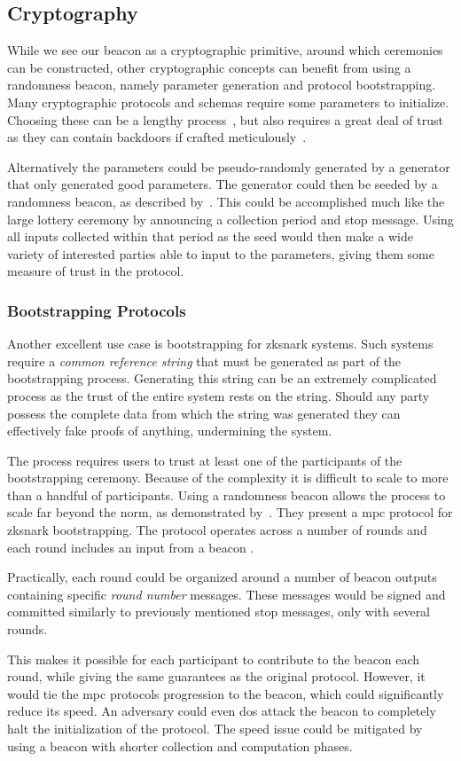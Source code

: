 \subsection{Cryptography}
While we see our beacon as a cryptographic primitive, around which ceremonies can be constructed, other cryptographic concepts can benefit from using a randomness beacon, namely parameter generation and protocol bootstrapping.
Many cryptographic protocols and schemas require some parameters to initialize.
Choosing these can be a lengthy process~\cite{mpcsnarks}, but also requires a great deal of trust as they can contain backdoors if crafted meticulously~\cite{nist2014backdoor}.

Alternatively the parameters could be pseudo-randomly generated by a generator that only generated good parameters.
The generator could then be seeded by a randomness beacon, as described by~\citet{baigneres2015trap}.
This could be accomplished much like the large lottery ceremony by announcing a collection period and stop message.
Using all inputs collected within that period as the seed would then make a wide variety of interested parties able to input to the parameters, giving them some measure of trust in the protocol.

\subsubsection{Bootstrapping Protocols}%
\label{ssub:bootstrapping_protocols}
Another excellent use case is bootstrapping for \gls{zksnark} systems.
Such systems require a \emph{common reference string} that must be generated as part of the bootstrapping process.
Generating this string can be an extremely complicated process as the trust of the entire system rests on the string.
Should any party possess the complete data from which the string was generated they can effectively fake proofs of anything, undermining the system.

The process requires users to trust at least one of the participants of the bootstrapping ceremony. Because of the complexity it is difficult to scale to more than a handful of participants.
Using a randomness beacon allows the process to scale far beyond the norm, as demonstrated by~\citet{mpcsnarks}.
They present a \acrshort{mpc} protocol for \acrshort{zksnark} bootstrapping.
The protocol operates across a number of rounds and each round includes an input from a beacon .

Practically, each round could be organized around a number of beacon outputs containing specific \textit{round number} messages.
These messages would be signed and committed similarly to previously mentioned stop messages, only with several rounds.

This makes it possible for each participant to contribute to the beacon each round, while giving the same guarantees as the original protocol.
However, it would tie the \acrshort{mpc} protocols progression to the beacon, which could significantly reduce its speed.
An adversary could even \acrshort{dos} attack the beacon to completely halt the initialization of the protocol.
The speed issue could be mitigated by using a beacon with shorter collection and computation phases.
